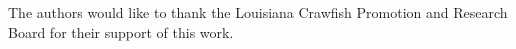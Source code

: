 \documentclass[twocolumn,10pt]{asme2e}
\begin{document}
\begin{acknowledgment}
The authors would like to thank the Louisiana Crawfish Promotion and Research Board for their support of this work.
\end{acknowledgment}

	




\end{document}
